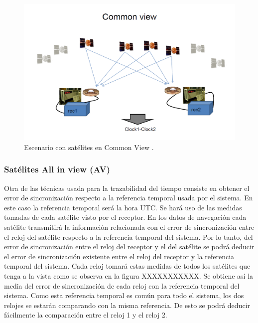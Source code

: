 \begin{figure}
	\centering
	\includegraphics[width=1\textwidth]{imagenes/commonview.PNG}
	\caption{\label{fig1}Escenario con satélites en Common View \cite{timetransfer}.}
\end{figure}

\subsubsection{Satélites All in view (AV)}
Otra de las técnicas usada para la trazabilidad del tiempo consiste en obtener el error de sincronización respecto a la referencia temporal usada por el sistema. En este caso la referencia temporal será la hora UTC. Se hará uso de las medidas tomadas de cada satélite visto por el receptor. En los datos de navegación cada satélite transmitirá la información relacionada con el error de sincronización entre el reloj del satélite respecto a la referencia temporal del sistema. Por lo tanto, del error de sincronización entre el reloj del receptor y el del satélite se podrá deducir el error de sincronización existente entre el reloj del receptor y la referencia temporal del sistema. Cada reloj tomará estas medidas de todos los satélites que tenga a la vista como se observa en la figura XXXXXXXXXXX. Se obtiene así la media del error de sincronización de cada reloj con la referencia temporal del sistema. Como esta referencia temporal es común para todo el sistema, los dos relojes se estarán comparando con la misma referencia. De esto se podrá deducir fácilmente la comparación entre el reloj 1 y el reloj 2.

